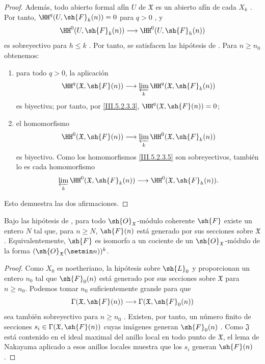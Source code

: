 \documentclass[oneside]{amsart}
\renewcommand{\leq}{\leqslant}
\renewcommand{\geq}{\geqslant}
\newcommand{\oldpage}[2][]{{\marginnote{\normalfont\textbf{#1}~|~#2}}\ignorespaces}
\let\EGAOriginalLabel\label
\renewcommand{\label}[1]{\phantomsection\EGAOriginalLabel{#1}}
\begin{document}
\begin{proof}
Además, todo abierto formal afín $U$ de $\mathfrak{X}$ es un
abierto afín de cada $X_k$ . Por tanto,
$\HH^q(U,\sh{F}_k(n))=0$ para $q>0$ , y
\[
  \HH^0(U,\sh{F}_k(n))
  \longrightarrow
  \HH^0(U,\sh{F}_h(n))
\]
es sobreyectivo para $h\leq k$ . Por tanto, se satisfacen
las hipótesis de . Para $n\geq n_0$
obtenemos:
\begin{enumerate}
  \item[$1^\circ$] para todo $q>0$, la aplicación
    \[
      \HH^q(\mathfrak{X},\sh{F}(n))
      \longrightarrow
      \varprojlim_k
      \HH^q(\mathfrak{X},\sh{F}_k(n))
    \]
    es biyectiva; por tanto, por \eqref{III.5.2.3.3},
    $\HH^q(\mathfrak{X},\sh{F}(n))=0$;
  \item[$2^\circ$] el homomorfismo
    \[
      \HH^0(\mathfrak{X},\sh{F}(n))
      \longrightarrow
      \varprojlim_k
      \HH^0(\mathfrak{X},\sh{F}_k(n))
    \]
    es biyectivo. Como los homomorfismos
    \eqref{III.5.2.3.5} son sobreyectivos, también lo es cada homomorfismo
    \[
      \varprojlim_k
      \HH^0(\mathfrak{X},\sh{F}_k(n))
      \longrightarrow
      \HH^0(\mathfrak{X},\sh{F}_h(n)).
    \]
\end{enumerate}
Esto demuestra las dos afirmaciones.
\end{proof}

\begin{corollary}[5.2.4]
\label{III.5.2.4}
Bajo las hipótesis de , para todo
$\sh{O}_{\mathfrak{X}}$-módulo coherente $\sh{F}$ existe un entero $N$
tal que, para $n\geq N$, $\sh{F}(n)$ está generado por sus secciones
sobre
\oldpage[III]{153}
$\mathfrak{X}$. Equivalentemente, $\sh{F}$ es isomorfo a un cociente
de un $\sh{O}_{\mathfrak{X}}$-módulo de la forma
$(\sh{O}_{\mathfrak X}(\setmin n))^k$.
\end{corollary}

\begin{proof}
Como $X_0$ es noetheriano, la hipótesis sobre $\sh{L}_0$ y
 proporcionan un entero $n_0$ tal que
$\sh{F}_0(n)$ está generado por sus secciones sobre $\mathfrak{X}$ para
$n\geq n_0$. Podemos tomar $n_0$ suficientemente grande para que
\[
  \Gamma(\mathfrak{X},\sh{F}(n))
  \longrightarrow
  \Gamma(\mathfrak{X},\sh{F}_0(n))
\]
sea también sobreyectivo para $n\geq n_0$ . Existen,
por tanto, un número finito de secciones
$s_i\in\Gamma(\mathfrak{X},\sh{F}(n))$ cuyas imágenes generan
$\sh{F}_0(n)$ . Como $\mathfrak{J}$ está
contenido en el ideal maximal del anillo local en todo punto
de $\mathfrak{X}$, el lema de Nakayama aplicado a esos anillos locales
muestra que los $s_i$ generan $\sh{F}(n)$
.
\end{proof}
\end{document}
